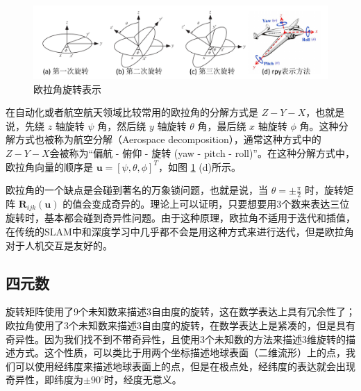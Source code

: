 \begin{figure}
    \centering
    \includegraphics[width=\textwidth]{images/rotation.pdf}
    \caption{欧拉角旋转表示}
    \label{fig:rotation}
    \vspace{-0.5cm}
\end{figure}

在自动化或者航空航天领域比较常用的欧拉角的分解方式是 $Z-Y-X$，也就是说，先绕 $z$ 轴旋转 $\psi$ 角，然后绕 $y$ 轴旋转 $\theta$ 角，最后绕 $x$ 轴旋转 $\phi$ 角。这种分解方式也被称为航空分解（Aerospace decomposition），通常这种方式中的$Z-Y-X$会被称为“偏航 - 俯仰 - 旋转 (yaw - pitch - roll)”。在这种分解方式中，欧拉角向量的顺序是 $\boldsymbol{u} = [\psi, \theta, \phi]^T$，如图 \ref{fig:rotation} (d)所示。

欧拉角的一个缺点是会碰到著名的万象锁问题\cite{vsenk2006rotation}，也就是说，当 $\theta = \pm \frac{\pi}{2}$ 时，旋转矩阵 $\boldsymbol{R}_{ijk}(\boldsymbol{u})$ 的值会变成奇异的。理论上可以证明，只要想要用3个数来表达三位旋转时，基本都会碰到奇异性问题\cite{stuelpnagel1964parametrization}。由于这种原理，欧拉角不适用于迭代和插值，在传统的SLAM中和深度学习中几乎都不会是用这种方式来进行迭代，但是欧拉角对于人机交互是友好的。

\subsection{四元数}
旋转矩阵使用了9个未知数来描述3自由度的旋转，这在数学表达上具有冗余性了；欧拉角使用了3个未知数来描述3自由度的旋转，在数学表达上是紧凑的，但是具有奇异性。因为我们找不到不带奇异性，且使用3个未知数的方法来描述3维旋转的描述方式\cite{stuelpnagel1964parametrization}。这个性质，可以类比于用两个坐标描述地球表面（二维流形）上的点，我们可以使用经纬度来描述地球表面上的点，但是在极点处，经纬度的表达就会出现奇异性，即纬度为$\pm 90^{\circ}$时，经度无意义。

